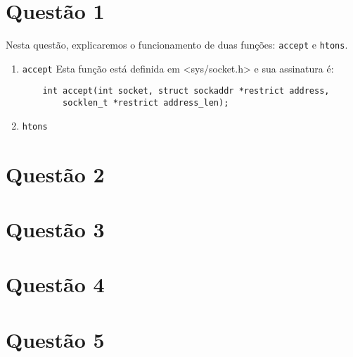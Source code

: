 \documentclass[a4paper,10pt]{article}
\begin{document}
\section{Questão 1}
Nesta questão, explicaremos o funcionamento de duas funções: {\tt accept} e {\tt htons}.
\begin{enumerate}
\item {\tt accept}
    Esta função está definida em <sys/socket.h> e sua assinatura é:
    \begin{lstlisting}
    int accept(int socket, struct sockaddr *restrict address,
        socklen_t *restrict address_len);
    \end{lstlisting}
\item {\tt htons}
\end{enumerate}

\section{Questão 2}

\section{Questão 3}

\section{Questão 4}

\section{Questão 5}
\end{document}

